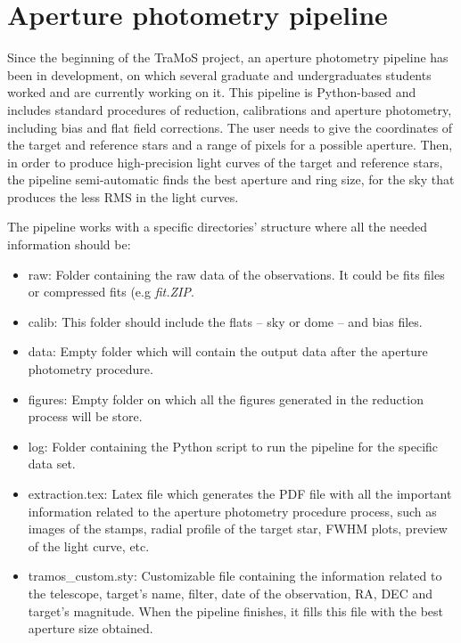 \chapter{Aperture photometry pipeline}\label{chap:pipeline}

Since the beginning of the TraMoS project, an aperture photometry pipeline has been in development, on which several graduate and undergraduates students worked and are currently working on it. This pipeline is Python-based and includes standard procedures of reduction, calibrations and aperture photometry, including bias and flat field corrections. The user needs to give the coordinates of the target and reference stars and a range of pixels for a possible aperture. Then, in order to produce high-precision light curves of the target and reference stars, the pipeline semi-automatic finds the best aperture and ring size, for the sky that produces the less RMS in the light curves. 

The pipeline works with a specific directories' structure where all the needed information should be:
\begin{itemize}
\item raw: Folder containing the raw data of the observations. It could be fits files or compressed fits (e.g \textit{fit.ZIP}.
\item calib: This folder should include the flats -- sky or dome -- and bias files.
\item data: Empty folder which will contain the output data after the aperture photometry procedure.
\item figures: Empty folder on which all the figures generated in the reduction process will be store.
\item log: Folder containing the Python script to run the pipeline for the specific data set.
\item extraction.tex: Latex file which generates the PDF file with all the important information related to the aperture photometry procedure process, such as images of the stamps, radial profile of the target star, FWHM plots, preview of the light curve, etc.
\item tramos\_custom.sty: Customizable file containing the information related to the telescope, target's name, filter, date of the observation, RA, DEC and target's magnitude. When the pipeline finishes, it fills this file with the best aperture size obtained.
\end{itemize}

